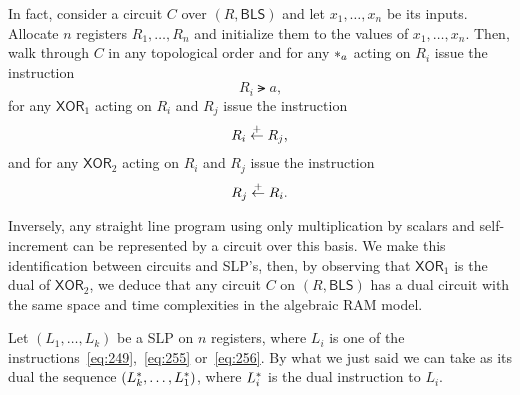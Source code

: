 In fact, consider a circuit $C$ over $(R,\mathsf{BLS})$ and let
$x_1,\ldots,x_n$ be its inputs. Allocate $n$ registers
$R_1,\ldots,R_n$ and initialize them to the values of
$x_1,\ldots,x_n$. Then, walk through $C$ in any topological order and
for any $*_{a}$ acting on $R_i$ issue the instruction
\begin{equation}
  \label{eq:249}
  R_i \lat a
  \text{,}
\end{equation}
for any $\mathsf{XOR}_1$ acting on $R_i$ and $R_j$ issue the
instruction
\begin{equation}
  \label{eq:255}
  R_i \overset{+}{\leftarrow} R_j
  \text{,}
\end{equation}
and for any $\mathsf{XOR}_2$ acting on $R_i$ and $R_j$ issue the
instruction
\begin{equation}
  \label{eq:256}
  R_j \overset{+}{\leftarrow} R_i
  \text{.}
\end{equation}

Inversely, any straight line program using only multiplication by
scalars and self-increment can be represented by a circuit over this
basis. We make this identification between circuits and SLP's, then,
by observing that $\mathsf{XOR}_1$ is the dual of $\mathsf{XOR}_2$, we
deduce that any circuit $C$ on $(R,\mathsf{BLS})$ has a dual circuit
with the same space and time complexities in the algebraic RAM model.

\begin{remark}
  Let $(L_1,\ldots,L_k)$ be a SLP on $n$ registers, where $L_i$ is one
  of the instructions~\eqref{eq:249},~\eqref{eq:255}
  or~\eqref{eq:256}. By what we just said we can take as its dual the
  sequence $(L_k^\ast,\ldots,L_1^\ast)$, where $L_i^\ast$ is the
  dual instruction to $L_i$.
\end{remark}


